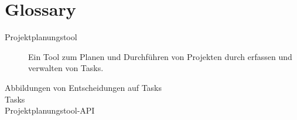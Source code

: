 \chapter{Glossary}
	\begin{description}
		\item[Projektplanungstool]{Ein Tool zum Planen und Durchführen von Projekten durch erfassen und verwalten von Tasks.}
		\item[Abbildungen von Entscheidungen auf Tasks]{}
		\item[Tasks]{}
		\item[Projektplanungstool-API]{}
	\end{description}